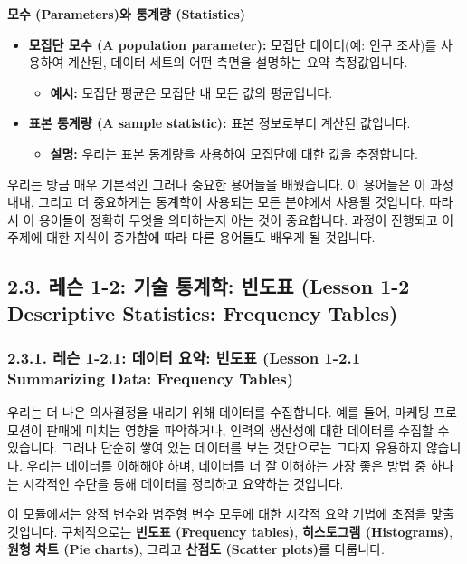 \documentclass[11pt,a4paper]{book}
\theoremstyle{definition}
\begin{document}
\begin{summarybox}
\textbf{모수 (Parameters)와 통계량 (Statistics)}
\begin{itemize}
    \item \textbf{모집단 모수 (A population parameter):} 모집단 데이터(예: 인구 조사)를 사용하여 계산된, 데이터 세트의 어떤 측면을 설명하는 요약 측정값입니다.
    \begin{itemize}
        \item \textbf{예시:} 모집단 평균은 모집단 내 모든 값의 평균입니다.
    \end{itemize}
    \item \textbf{표본 통계량 (A sample statistic):} 표본 정보로부터 계산된 값입니다.
    \begin{itemize}
        \item \textbf{설명:} 우리는 표본 통계량을 사용하여 모집단에 대한 값을 추정합니다.
    \end{itemize}
\end{itemize}
\end{summarybox}
우리는 방금 매우 기본적인 그러나 중요한 용어들을 배웠습니다. 이 용어들은 이 과정 내내, 그리고 더 중요하게는 통계학이 사용되는 모든 분야에서 사용될 것입니다. 따라서 이 용어들이 정확히 무엇을 의미하는지 아는 것이 중요합니다. 과정이 진행되고 이 주제에 대한 지식이 증가함에 따라 다른 용어들도 배우게 될 것입니다.


\subsection{2.3. 레슨 1-2: 기술 통계학: 빈도표 (Lesson 1-2 Descriptive Statistics: Frequency Tables)}

\subsubsection{2.3.1. 레슨 1-2.1: 데이터 요약: 빈도표 (Lesson 1-2.1 Summarizing Data: Frequency Tables)}

\begin{tcolorbox}[title={데이터 요약 (Summarizing Data)}]
우리는 더 나은 의사결정을 내리기 위해 데이터를 수집합니다. 예를 들어, 마케팅 프로모션이 판매에 미치는 영향을 파악하거나, 인력의 생산성에 대한 데이터를 수집할 수 있습니다. 그러나 단순히 쌓여 있는 데이터를 보는 것만으로는 그다지 유용하지 않습니다. 우리는 데이터를 이해해야 하며, 데이터를 더 잘 이해하는 가장 좋은 방법 중 하나는 시각적인 수단을 통해 데이터를 정리하고 요약하는 것입니다.

이 모듈에서는 양적 변수와 범주형 변수 모두에 대한 시각적 요약 기법에 초점을 맞출 것입니다. 구체적으로는 \textbf{빈도표 (Frequency tables)}, \textbf{히스토그램 (Histograms)}, \textbf{원형 차트 (Pie charts)}, 그리고 \textbf{산점도 (Scatter plots)}를 다룹니다.
\end{tcolorbox}
\end{document}
